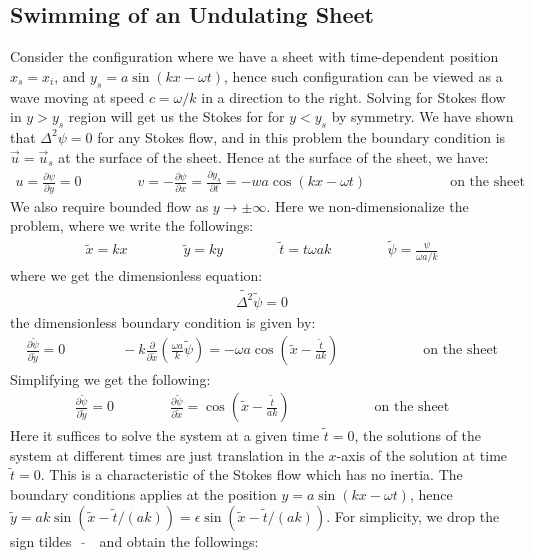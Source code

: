 \documentclass[11pt]{book}
\theoremstyle{break}
\theoremstyle{break}
\newcommand{\pd}{\partial}
\newcommand{\that}[1]{\widetilde{#1}}
\begin{document}
\subsection{Swimming of an Undulating Sheet}
Consider the configuration where we have a sheet with time-dependent position $x_s = x_i$, and $y_s = a\sin(kx-\omega t)$, hence such configuration can be viewed as a wave moving at speed $c = \omega/k$ in a direction to the right. Solving for Stokes flow in $y>y_s$ region will get us the Stokes for for $y< y_s$ by symmetry. We have shown that $\Delta^2 \psi = 0$ for any Stokes flow, and in this problem the boundary condition is $\vec{u} = \vec{u}_s$ at the surface of the sheet. Hence at the surface of the sheet, we have:
\begin{align*}
u = \frac{\pd \psi}{\pd y} = 0\qquad\qquad v=-\frac{\pd \psi}{\pd x} = \frac{\pd y_s}{\pd t}=-wa\cos(kx-\omega t) \qquad\qquad\qquad \text{on the sheet}
\end{align*}
We also require bounded flow as $y\to \pm\infty$. Here we non-dimensionalize the problem, where we write the followings:
\begin{align*}
\that{x} = kx \qquad\qquad \that{y} = ky\qquad\qquad \that{t} = t\omega ak \qquad\qquad \that{\psi} = \frac{\psi}{\omega a/k}
\end{align*}
where we get the dimensionless equation:
\begin{align*}
\that{\Delta^2} \that{\psi} = 0
\end{align*}
the dimensionless boundary condition is given by:
\begin{align*}
\frac{\pd \that{\psi}}{\pd \that{y}}=0\qquad\qquad -k\frac{\pd}{\pd \that{x}}\left( \frac{\omega a}{k}\that{\psi}\right) = -\omega a \cos\left(\that{x} -\frac{\that{t}}{ak}\right) \qquad\qquad\qquad \text{on the sheet}
\end{align*}
Simplifying we get the following:
\begin{align*}
\frac{\pd \that{\psi}}{\pd \that{y}}=0\qquad\qquad \frac{\pd \that{\psi}}{\pd \that{x}} = \cos\left( \that{x}-\frac{\that{t}}{ak}\right) \qquad\qquad\qquad \text{on the sheet}
\end{align*}
Here it suffices to solve the system at a given time $\that{t} = 0$, the solutions of the system at different times are just translation in the $x$-axis of the solution at time $\that{t} = 0$. This is a characteristic of the Stokes flow which has no inertia. The boundary conditions applies at the position $y = a\sin(kx-\omega t)$, hence $\that{y} = ak \sin(\that{x} - \that{t} / (ak)) = \epsilon \sin(\that{x} - \that{t} / (ak))$. For simplicity, we drop the sign tildes\ \ $\that{}$\ \ and obtain the followings:
\end{document}
